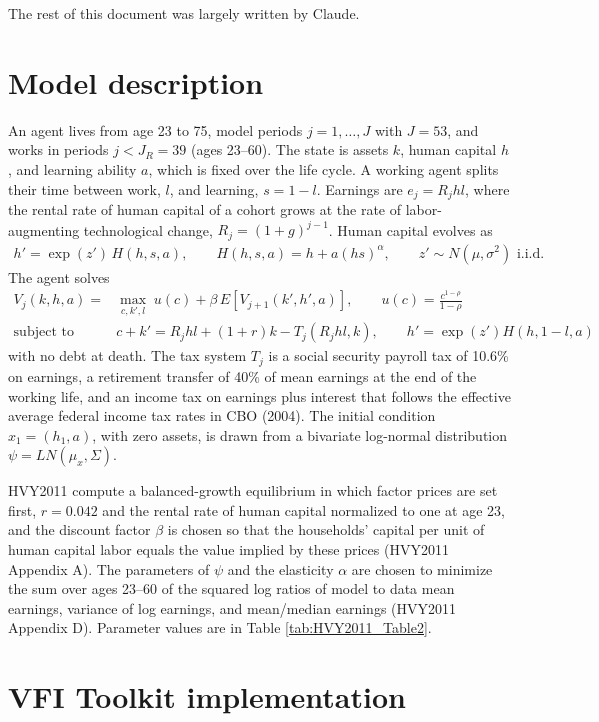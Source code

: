 \documentclass[11pt,fleqn]{article}
\begin{document}
The rest of this document was largely written by Claude.

\section{Model description}

An agent lives from age 23 to 75, model periods $j=1,\ldots,J$ with $J=53$, and works in periods $j<J_R=39$ (ages 23--60). The state is assets $k$, human capital $h$, and learning ability $a$, which is fixed over the life cycle. A working agent splits their time between work, $l$, and learning, $s=1-l$. Earnings are $e_j=R_j h l$, where the rental rate of human capital of a cohort grows at the rate of labor-augmenting technological change, $R_j=(1+g)^{j-1}$. Human capital evolves as
\begin{align*}
 h' = \exp(z')\,H(h,s,a), \qquad H(h,s,a)=h+a(hs)^{\alpha}, \qquad z'\sim N(\mu,\sigma^2) \text{ i.i.d.}
\end{align*}
The agent solves
\begin{align*}
 V_j(k,h,a) = & \max_{c,k',l} \; u(c) + \beta\, E\left[V_{j+1}(k',h',a)\right], \qquad u(c)=\frac{c^{1-\rho}}{1-\rho}\\
 \text{subject to } & c+k' = R_j h l + (1+r) k - T_j(R_j h l, k), \qquad h' = \exp(z')H(h,1-l,a)
\end{align*}
with no debt at death. The tax system $T_j$ is a social security payroll tax of 10.6\% on earnings, a retirement transfer of 40\% of mean earnings at the end of the working life, and an income tax on earnings plus interest that follows the effective average federal income tax rates in CBO (2004). The initial condition $x_1=(h_1,a)$, with zero assets, is drawn from a bivariate log-normal distribution $\psi=LN(\mu_x,\Sigma)$.

HVY2011 compute a balanced-growth equilibrium in which factor prices are set first, $r=0.042$ and the rental rate of human capital normalized to one at age 23, and the discount factor $\beta$ is chosen so that the households' capital per unit of human capital labor equals the value implied by these prices (HVY2011 Appendix A). The parameters of $\psi$ and the elasticity $\alpha$ are chosen to minimize the sum over ages 23--60 of the squared log ratios of model to data mean earnings, variance of log earnings, and mean/median earnings (HVY2011 Appendix D). Parameter values are in Table \ref{tab:HVY2011_Table2}.


\section{VFI Toolkit implementation}
\end{document}
